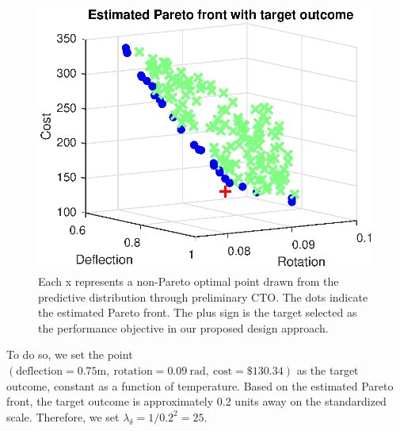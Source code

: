 \documentclass[12pt]{article}
\begin{document}
\begin{figure}
\centering
\includegraphics[scale=0.8]{FIG_est_PF_with_des_obs.eps}
\caption{Each x represents a non-Pareto optimal point drawn from the predictive distribution through preliminary CTO. The dots indicate the estimated Pareto front. The plus sign is the target selected as the performance objective in our proposed design approach.}
\label{fig:elbow}
\end{figure}
%
To do so, we set the point $(\mathrm{deflection}=0.75\mathrm m,\ 
\mathrm{rotation}=0.09\ \mathrm{rad},\ 
\mathrm{cost}=\$130.34)$
 as the target outcome, constant as a function of temperature.
%
Based on the estimated Pareto front, the target outcome is approximately 0.2 units away on the standardized scale.
%
Therefore, we set $\lambda_\delta=1/0.2^2=25.$
%
\end{document}
